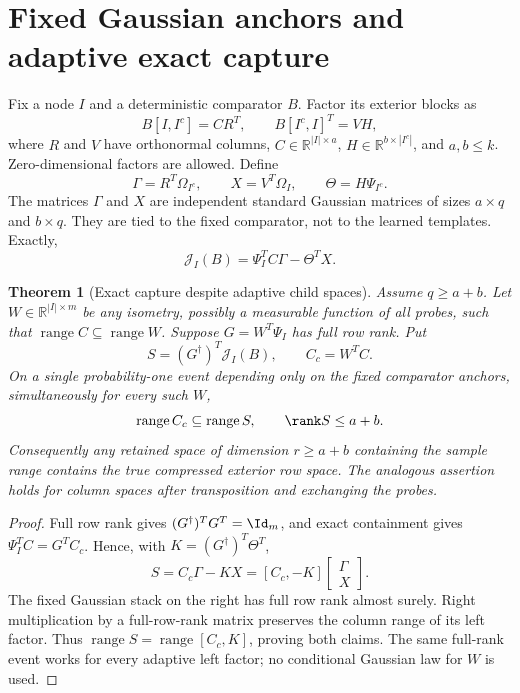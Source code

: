 \documentclass[11pt,oneside,openany,a4paper]{book}
\numberwithin{equation}{chapter}
\newtheorem{theorem}{Theorem}[chapter]
\theoremstyle{definition}
\theoremstyle{remark}
\newcommand{\R}{\mathbb R}\newcommand{\E}{\mathbb E}\newcommand{\Prb}{\mathbb P}\newcommand{\PP}{\mathbb P}
\DeclareMathOperator{\ran}{range}\DeclareMathOperator{\OPT}{OPT}
\newcommand{\J}{\mathcal J}\newcommand{\transpose}{\mathsf T}
\begin{document}
\section{Fixed Gaussian anchors and adaptive exact capture}
Fix a node $I$ and a deterministic comparator $B$. Factor its exterior blocks as
\begin{equation}\label{comm:eq:factor}
 B[I,I^c]=C R^T,\qquad B[I^c,I]^T=V H,
\end{equation}
where $R$ and $V$ have orthonormal columns, $C\in\R^{|I|\times a}$, $H\in\R^{b\times|I^c|}$, and $a,b\le k$. Zero-dimensional factors are allowed. Define
\begin{equation}\label{comm:eq:anchors}
 \Gamma=R^T\Omega_{I^c},\qquad X=V^T\Omega_I,
 \qquad\Theta=H\Psi_{I^c}.
\end{equation}
The matrices $\Gamma$ and $X$ are independent standard Gaussian matrices of sizes $a\times q$ and $b\times q$. They are tied to the fixed comparator, not to the learned templates. Exactly,
\begin{equation}\label{comm:eq:Jfactor}
 \J_I(B)=\Psi_I^TC\Gamma-\Theta^T X.
\end{equation}

\begin{theorem}[Exact capture despite adaptive child spaces]\label{comm:thm:capture}
Assume $q\ge a+b$. Let $W\in\R^{|I|\times m}$ be any isometry, possibly a measurable function of all probes, such that $\ran C\subseteq\ran W$. Suppose $G=W^T\Psi_I$ has full row rank. Put
\[
 S=(G^\dagger)^T\J_I(B),\qquad C_c=W^TC.
\]
On a single probability-one event depending only on the fixed comparator anchors, simultaneously for every such $W$,
\begin{equation}\label{comm:eq:capture}
 \ran C_c\subseteq\ran S,\qquad\rank S\le a+b.
\end{equation}
Consequently any retained space of dimension $r\ge a+b$ containing the sample range contains the true compressed exterior row space. The analogous assertion holds for column spaces after transposition and exchanging the probes.
\end{theorem}
\begin{proof}
Full row rank gives $(G^\dagger)^TG^T=\Id_m$, and exact containment gives $\Psi_I^TC=G^TC_c$. Hence, with $K=(G^\dagger)^T\Theta^T$,
\[
 S=C_c\Gamma-KX=[C_c,-K]\begin{bmatrix}\Gamma\\X\end{bmatrix}.
\]
The fixed Gaussian stack on the right has full row rank almost surely. Right multiplication by a full-row-rank matrix preserves the column range of its left factor. Thus $\ran S=\ran[C_c,K]$, proving both claims. The same full-rank event works for every adaptive left factor; no conditional Gaussian law for $W$ is used.
\end{proof}
\end{document}
